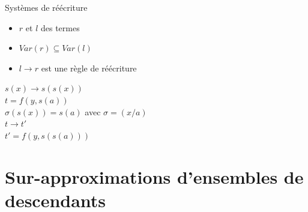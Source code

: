 \documentclass[xcolor={dvipsnames}]{beamer}
\begin{document}
\begin{frame}{Systèmes de réécriture}
  \begin{itemize}
  \item $r$ et $l$ des termes
  \item $Var(r) \subseteq Var(l)$
  \item $l \rightarrow r$ est une règle de réécriture
  \end{itemize}
  \begin{center}
    $s(x) \rightarrow s(s(x))$\\
    $t = f(y,s(a))$\\
    $\sigma(s(x)) = s(a)$ avec $\sigma = (x / a)$\\
    $t \rightarrow t'$ \\
    $t' = f(y,s(s(a)))$ \\
    \begin{overprint}
      \begin{center}
      \end{center}
      \begin{center}
      \end{center}
      \begin{center}
      \end{center}
    \end{overprint}
  \end{center}
\end{frame}

\section{Sur-approximations d'ensembles de descendants}
\end{document}
